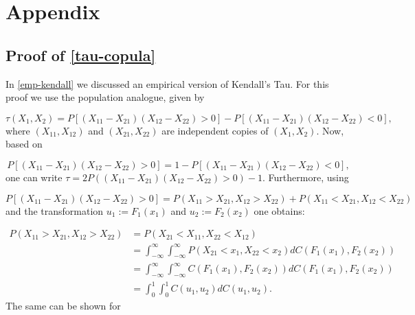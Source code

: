 
\chapter{Appendix} %

\label{AppendixA} %


\section{Proof of \ref{tau-copula}}

In \ref{emp-kendall} we discussed an empirical version of Kendall's Tau. For this proof we use the population analogue, given by

\begin{equation*}
	\tau\left(X_{1}, X_{2}\right)=P\left[ \left(X_{11}-X_{21}\right)\left(X_{12}-X_{22}\right)>0\right] -P\left[ \left(X_{11}-X_{21}\right)\left(X_{12}-X_{22}\right)<0\right] ,
\end{equation*}
%
where $(X_{11},X_{12})$ and $(X_{21},X_{22})$ are independent copies of $(X_1,X_2)$.
%
Now, based on 

\begin{equation*}
	P\left[ \left(X_{11}-X_{21}\right)\left(X_{12}-X_{22}\right)>0\right] =1-P\left[ \left(X_{11}-X_{21}\right)\left(X_{12}-X_{22}\right)<0\right],
\end{equation*}
%
one can write $\tau=2 P\left(\left(X_{11}-X_{21}\right)\left(X_{12}-X_{22}\right)>0\right)-1$.
%
Furthermore, using 

\begin{equation*}
	{\scriptstyle P\left[ \left(X_{11}-X_{21}\right)\left(X_{12}-X_{22}\right)>0\right] =P\left(X_{11}>X_{21}, X_{12}>X_{22}\right)+P\left(X_{11}<X_{21}, X_{12}<X_{22}\right)}
\end{equation*}
%
and the transformation $u_{1}:=F_{1}\left(x_{1}\right)$ and $u_{2}:=F_{2}\left(x_{2}\right)$ one obtains:

\begin{equation*}
	\begin{aligned}
		P\left(X_{11}>X_{21}, X_{12}>X_{22}\right) &=P\left(X_{21}<X_{11}, X_{22}<X_{12}\right) \\
		&=\int_{-\infty}^{\infty} \int_{-\infty}^{\infty} P\left(X_{21}<x_{1}, X_{22}<x_{2}\right) d C\left(F_{1}\left(x_{1}\right), F_{2}\left(x_{2}\right)\right) \\
		&=\int_{-\infty}^{\infty} \int_{-\infty}^{\infty} C\left(F_{1}\left(x_{1}\right), F_{2}\left(x_{2}\right)\right) d C\left(F_{1}\left(x_{1}\right), F_{2}\left(x_{2}\right)\right) \\
		&=\int_{0}^{1} \int_{0}^{1} C\left(u_{1}, u_{2}\right) d C\left(u_{1}, u_{2}\right).
	\end{aligned}
\end{equation*}
%
The same can be shown for 

